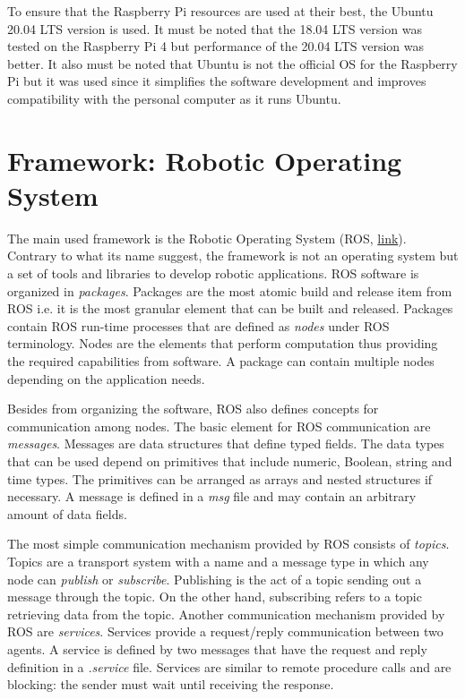 \documentclass{article}
\begin{document}
To ensure that the Raspberry Pi resources are used at their best, the Ubuntu 20.04 LTS version is used. It must be noted that the 18.04 LTS version was tested on the Raspberry Pi 4 but performance of the 20.04 LTS version was better. It also must be noted that Ubuntu is not the official OS for the Raspberry Pi but it was used since it simplifies the software development and improves compatibility with the personal computer as it runs Ubuntu. 

\newpage
\section{Framework: Robotic Operating System}
The main used framework is the Robotic Operating System (ROS, \href{https://ros.org/}{link}). Contrary to what its name suggest, the framework is not an operating system but a set of tools and libraries to develop robotic applications. ROS software is organized in \textit{packages}. Packages are the most atomic build and release item from ROS i.e. it is the most granular element that can be built and released. Packages contain ROS run-time processes that are defined as \textit{nodes} under ROS terminology. Nodes are the elements that perform computation thus providing the required capabilities from software. A package can contain multiple nodes depending on the application needs.

Besides from organizing the software, ROS also defines concepts for communication among nodes. The basic element for ROS communication are \textit{messages}. Messages are data structures that define typed fields. The data types that can be used depend on primitives that include numeric, Boolean, string and time types. The primitives can be arranged as arrays and nested structures if necessary. A message is defined in a \textit{msg} file and may contain an arbitrary amount of data fields.

The most simple communication mechanism provided by ROS consists of \textit{topics}. Topics are a transport system with a name and a message type in which any node can \textit{publish} or \textit{subscribe}. Publishing is the act of a topic sending out a message through the topic. On the other hand, subscribing refers to a topic retrieving data from the topic. Another communication mechanism provided by ROS are \textit{services}. Services provide a request/reply communication between two agents. A service is defined by two messages that have the request and reply definition in a \textit{.service} file. Services are similar to remote procedure calls and are blocking: the sender must wait until receiving the response.
\end{document}
